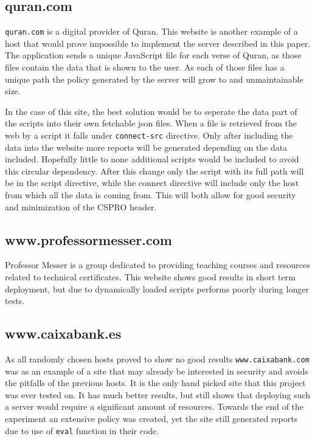 \subsection{quran.com}

\texttt{quran.com} is a digital provider of Quran. 
This website is another example of a host that would prove impossible to implement the server described in this paper.
The application sends a unique JavaScript file for each verse of Quran, as those files contain the data that is shown to the user.
As each of those files has a unique path the policy generated by the server will grow to and unmaintainable size.

In the case of this site, the best solution would be to seperate the data part of the scripts into their own fetchable json files.
When a file is retrieved from the web by a script it falls under \texttt{connect-src} directive. 
Only after including the data into the website more reports will be generated depending on the data included.
Hopefully little to none additional scripts would be included to avoid this circular dependency.
After this change only the script with its full path will be in the script directive, while the connect directive will include only the host from which all the data is coming from.
This will both allow for good security and minimization of the CSPRO header.

\subsection{www.professormesser.com}

Professor Messer is a group dedicated to providing teaching courses and resources related to technical certificates.
This website shows good results in short term deployment, but due to dynamically loaded scripts performs poorly during longer tests.


\subsection{www.caixabank.es}

As all randomly chosen hosts proved to show no good results \texttt{www.caixabank.com} was as an example of a site that may already be interested in security and avoids the pitfalls of the previous hosts.
It is the only hand picked site that this project was ever tested on. 
It has much better results, but still shows that deploying such a server would require a significant amount of resources.
Towards the end of the experiment an extensive policy was created, yet the site still generated reports due to use of \texttt{eval} function in their code.

